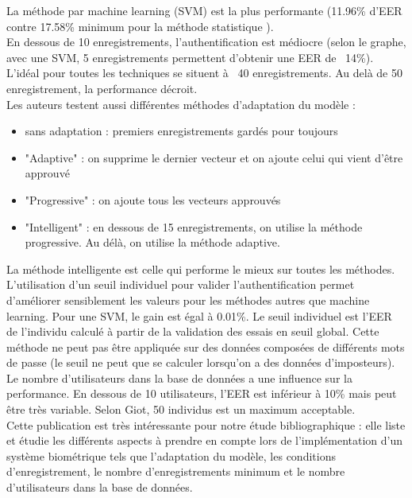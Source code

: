 La méthode par machine learning (SVM) est la plus performante (11.96\% d'EER contre 17.58\% minimum pour la méthode statistique ).\\

En dessous de 10 enregistrements, l'authentification est médiocre (selon le graphe, avec une SVM, 5 enregistrements permettent d'obtenir une EER de ~14\%). L'idéal pour toutes les techniques se situent à ~40 enregistrements. Au delà de 50 enregistrement, la performance décroit.\\

Les auteurs testent aussi différentes méthodes d'adaptation du modèle :\\

\begin{itemize}
  \item sans adaptation : premiers enregistrements gardés pour toujours
  \item "Adaptive" : on supprime le dernier vecteur et on ajoute celui qui vient d'être approuvé
  \item "Progressive" : on ajoute tous les vecteurs approuvés
  \item "Intelligent" : en dessous de 15 enregistrements, on utilise la méthode progressive. Au délà, on utilise la méthode adaptive.
\end{itemize}

La méthode intelligente est celle qui performe le mieux sur toutes les méthodes.\\

L'utilisation d'un seuil individuel pour valider l'authentification permet d'améliorer sensiblement les valeurs pour les méthodes autres que machine learning. Pour une SVM, le gain est égal à 0.01\%. Le seuil individuel est l'EER de l'individu calculé à partir de la validation des essais en seuil global. Cette méthode ne peut pas être appliquée sur des données composées de différents mots de passe (le seuil ne peut que se calculer lorsqu'on a des données d'imposteurs).\\

Le nombre d'utilisateurs dans la base de données a une influence sur la performance. En dessous de 10 utilisateurs, l'EER est inférieur à 10\% mais peut être très variable. Selon Giot, 50 individus est un maximum acceptable.\\

Cette publication est très intéressante pour notre étude bibliographique : elle liste et étudie les différents aspects à prendre en compte lors de l'implémentation d'un système biométrique tels que l'adaptation du modèle, les conditions d'enregistrement, le nombre d'enregistrements minimum et le nombre d'utilisateurs dans la base de données.

